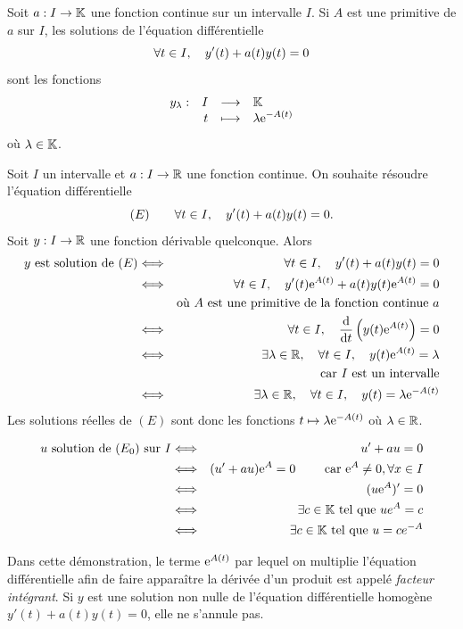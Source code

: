 \documentclass{magnolia}
\begin{document}
\begin{proposition}[utile=-3]
Soit $a:I\to\mathbb{K}$ une fonction continue sur un intervalle $I$. Si $A$ est
une primitive de $a$ sur $I$, les solutions de l'équation différentielle
\[\forall t\in I ,\quad y'(t)+a(t)y(t)=0\]
sont les fonctions
\[\begin{array}[t]{lrcl} \displaystyle{y_\lambda} : & \displaystyle{I} & \longrightarrow & \displaystyle{\ensuremath{\mathbb{K}}} \\ & \displaystyle{t} & \longmapsto & \displaystyle{\lambda {\rm e}^{-A(t)}} \end{array}\]
où $\lambda\in\mathbb{K}$.
\end{proposition}

\begin{preuve}
\begin{francois}
Soit $I$ un intervalle et $a:I\to\mathbb{R}$ une fonction continue. On souhaite résoudre l'équation différentielle
\[(E)\qquad\forall t\in I,\quad y'(t)+a(t)y(t)=0.\]
Soit $y:I\to\mathbb{R}$ une fonction dérivable quelconque. Alors
\begin{eqnarray*}
\text{$y$ est solution de $(E)$}
&\Longleftrightarrow& \forall t\in I,\quad y'(t)+a(t)y(t)=0\\
&\Longleftrightarrow& \forall t\in I,\quad y'(t){\rm e}^{A(t)}+a(t)y(t){\rm e}^{A(t)}=0\\
&    & \text{où $A$ est une primitive de la fonction continue $a$}\\
&\Longleftrightarrow& \forall t\in I,\quad \frac{{\rm d}}{{\rm d}t}\left(y(t){\rm e}^{A(t)}\right)=0\\
&\Longleftrightarrow& \exists \lambda\in\mathbb{R},\quad\forall t\in I,\quad y(t){\rm e}^{A(t)}=\lambda\\
&    & \text{car $I$ est un intervalle}\\
&\Longleftrightarrow& \exists \lambda\in\mathbb{R},\quad\forall t\in I,\quad y(t)=\lambda{\rm e}^{-A(t)}
\end{eqnarray*}
Les solutions réelles de $(E)$ sont donc les fonctions $t\mapsto \lambda {\rm e}^{-A(t)}$
où $\lambda\in\mathbb{R}$.
\end{francois}
\begin{victor}
\begin{eqnarray*}
u \text{ solution de } (E_0) \text{ sur } I&\Longleftrightarrow & u'+au=0 \\
&\Longleftrightarrow & (u'+au){\rm e}^A=0 \qquad\text{ car } {\rm e}^A\neq 0, \forall x \in I \\
&\Longleftrightarrow &(u{\rm e}^A)'=0\\
&\Longleftrightarrow & \exists c\in \mathbb{K} \text{ tel que } ue^A=c\\
&\Longleftrightarrow & \exists c\in \mathbb{K} \text{ tel que } u=ce^{-A}
\end{eqnarray*}
\end{victor}
\end{preuve}

\begin{remarques}
\remarque Dans cette démonstration, le terme ${\rm e}^{A(t)}$ par lequel on multiplie l'équation différentielle afin de faire apparaître la dérivée d'un produit est appelé \emph{facteur intégrant}.
\remarque Si $y$ est une solution non nulle de l'équation différentielle homogène $y'(t)+a(t) y(t)=0$, elle ne s'annule pas.
\end{remarques}
\end{document}
